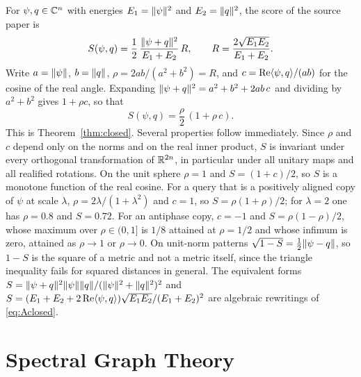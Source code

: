 For $\psi,q\in\mathbb{C}^n$ with energies $E_1=\lVert \psi\rVert^2$ and $E_2=\lVert q\rVert^2$, the score of the source paper is
\begin{equation}
S(\psi,q)=\frac12\,\frac{\lVert \psi+q\rVert^2}{E_1+E_2}\,R,\qquad R=\frac{2\sqrt{E_1E_2}}{E_1+E_2}.
\end{equation}
Write $a=\lVert \psi\rVert$, $b=\lVert q\rVert$, $\rho=2ab/(a^2+b^2)=R$, and $c=\operatorname{Re}\langle \psi,q\rangle/(ab)$ for the cosine of the real angle. Expanding $\lVert \psi+q\rVert^2=a^2+b^2+2ab\,c$ and dividing by $a^2+b^2$ gives $1+\rho c$, so that
\begin{equation}\label{eq:Aclosed}
S(\psi,q)=\frac\rho2\,(1+\rho\,c).
\end{equation}
This is Theorem~\ref{thm:closed}. Several properties follow immediately. Since $\rho$ and $c$ depend only on the norms and on the real inner product, $S$ is invariant under every orthogonal transformation of $\mathbb{R}^{2n}$, in particular under all unitary maps and all realified rotations. On the unit sphere $\rho=1$ and $S=(1+c)/2$, so $S$ is a monotone function of the real cosine. For a query that is a positively aligned copy of $\psi$ at scale $\lambda$, $\rho=2\lambda/(1+\lambda^2)$ and $c=1$, so $S=\rho(1+\rho)/2$; for $\lambda=2$ one has $\rho=0.8$ and $S=0.72$. For an antiphase copy, $c=-1$ and $S=\rho(1-\rho)/2$, whose maximum over $\rho\in(0,1]$ is $1/8$ attained at $\rho=1/2$ and whose infimum is zero, attained as $\rho\to1$ or $\rho\to0$. On unit-norm patterns $\sqrt{1-S}=\tfrac12\lVert \psi-q\rVert$, so $1-S$ is the square of a metric and not a metric itself, since the triangle inequality fails for squared distances in general. The equivalent forms $S=\lVert \psi+q\rVert^2\lVert \psi\rVert\lVert q\rVert/(\lVert \psi\rVert^2+\lVert q\rVert^2)^2$ and $S=(E_1+E_2+2\operatorname{Re}\langle \psi,q\rangle)\sqrt{E_1E_2}/(E_1+E_2)^2$ are algebraic rewritings of \eqref{eq:Aclosed}.

\chapter{Spectral Graph Theory}\label{app:graph}

